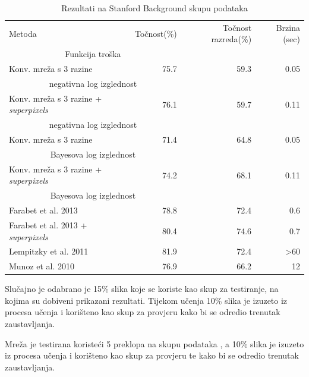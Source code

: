 \documentclass[times, utf8, diplomski, numeric]{fer}
\begin{document}
\begin{table}
\centering

\begin{adjustbox}{center}
\begin{tabular}{l r r r}
  Metoda & Točnost(\%) & Točnost razreda(\%) & Brzina (sec) \\
    \multicolumn{2}{c}{Funkcija troška} & & \\[0.6em] \hline

  Konv. mreža s 3 razine & 75.7 & 59.3 & 0.05 \\
    \multicolumn{2}{c}{negativna log izglednost} & & \\ \hline
  Konv. mreža s 3 razine + \textit{superpixels} & 76.1 & 59.7 & 0.11 \\
    \multicolumn{2}{c}{negativna log izglednost} & & \\ \hline
  Konv. mreža s 3 razine & 71.4 & 64.8 & 0.05 \\
    \multicolumn{2}{c}{Bayesova log izglednost} & & \\ \hline
  Konv. mreža s 3 razine + \textit{superpixels} & 74.2 & 68.1 & 0.11 \\
    \multicolumn{2}{c}{Bayesova log izglednost} & & \\ \hline \hline
    
  Farabet et al.\cite{farabet_pami} 2013 & 78.8 & 72.4 & 0.6 \\ \hline
  Farabet et al.\cite{farabet_pami} 2013 + \textit{superpixels} & 80.4 & 74.6 & 0.7 \\ \hline
  Lempitzky et al.\cite{lempitsky11} 2011 & 81.9 & 72.4 & >60 \\ \hline
  Munoz et al.\cite{munoz10} 2010 & 76.9 & 66.2 & 12
\end{tabular}
\end{adjustbox}

\caption{Rezultati na Stanford Background skupu podataka}
\end{table}

Slučajno je odabrano je 15\% slika koje se koriste kao skup za testiranje, na kojima su dobiveni prikazani rezultati. Tijekom učenja 10\% slika je izuzeto iz procesa učenja i korišteno kao skup za provjeru  kako bi se odredio trenutak zaustavljanja.

Mreža je testirana koristeći 5 preklopa na skupu podataka , a 10\% slika je izuzeto iz procesa učenja i korišteno kao skup za provjeru te kako bi se odredio trenutak zaustavljanja.
\end{document}
